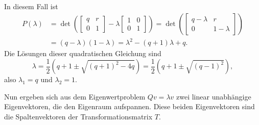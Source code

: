 \documentclass[a4paper,10pt,fleqn,twoside]{scrartcl}
\numberwithin{equation}{section}
\theoremstyle{Aufgabe}
\begin{document}
In diesem Fall ist
\[\begin{split}
P(\lambda) &= \det\left(\begin{bmatrix}
q & r\\
0 & 1
\end{bmatrix}-\lambda\begin{bmatrix}
1 & 0\\
0 & 1
\end{bmatrix}\right)
= \det\left(\begin{bmatrix}
q-\lambda & r\\
0 & 1-\lambda
\end{bmatrix}\right)\\
&= (q-\lambda)(1-\lambda)
= \lambda^2 -(q+1)\lambda+q.\end{split}
\]
Die Lösungen dieser quadratischen Gleichung sind
\[\lambda = \frac{1}{2}(q+1\pm\sqrt{(q+1)^2-4q})
= \frac{1}{2}(q+1\pm\sqrt{(q-1)^2}),\]
also $\lambda_1 = q$ und $\lambda_2=1.$

Nun ergeben sich aus dem Eigenwertproblem $Qv = \lambda v$ zwei linear
unabhängige Eigenvektoren, die den Eigenraum aufspannen. Diese beiden
Eigenvektoren sind die Spaltenvektoren der Transformationsmatrix $T$.
\end{document}
